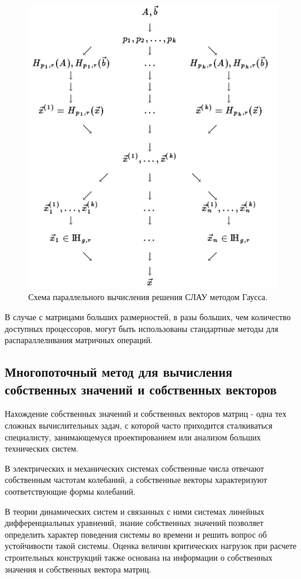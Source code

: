 \documentclass[master, och, diploma, times]{sty/SCWorks}
\theoremstyle{plain}
\theoremstyle{definition}
\begin{document}
\begin{figure}[H]
\centerline{\includegraphics[width=0.7\linewidth]{images/multi/native.png}}
\caption{Схема параллельного вычисления решения СЛАУ методом Гаусса.}
\label{img:multi:gauss}
\end{figure}


В случае с матрицами больших размерностей, в разы больших, чем количество доступных процессоров, могут быть использованы стандартные методы для распараллеливания матричных операций.


\subsection{Многопоточный метод для вычисления собственных значений и собственных векторов}

Нахождение собственных значений и собственных векторов матриц - одна тех сложных вычислительных задач, с которой часто приходится сталкиваться специалисту, занимающемуся проектированием или анализом больших технических систем.

В электрических и механических системах собственные числа отвечают собственным частотам колебаний, а собственные векторы характеризуют соответствующие формы колебаний.

В теории динамических систем и связанных с ними системах линейных дифференциальных уравнений, знание собственных значений позволяет определить характер поведения системы во времени и решить вопрос об устойчивости такой системы. Оценка величин критических нагрузок при расчете строительных конструкций также основана на информации о собственных значения и собственных вектора матриц. 
\end{document}
